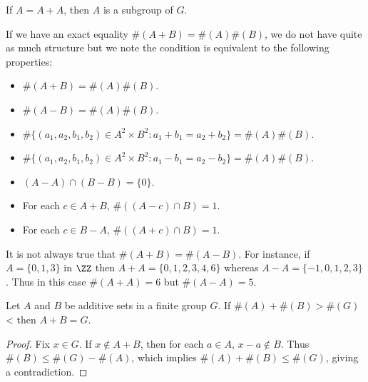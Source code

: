 \begin{corollary}
    If $A = A + A$, then $A$ is a subgroup of $G$.
\end{corollary}

If we have an exact equality $\#(A + B) = \#(A) \#(B)$, we do not have quite as much structure but we note the condition is equivalent to the following properties:
%
\begin{itemize}
    \item $\#(A + B) = \#(A) \#(B)$.
    \item $\#(A - B) = \#(A) \#(B)$.
    \item $\# \{ (a_1,a_2,b_1,b_2) \in A^2 \times B^2 : a_1 + b_1 = a_2 + b_2 \} = \#(A) \#(B)$.
    \item $\# \{ (a_1,a_2,b_1,b_2) \in A^2 \times B^2 : a_1 - b_1 = a_2 - b_2 \} = \#(A) \#(B)$.
    \item $(A - A) \cap (B - B) = \{ 0 \}$.
    \item For each $c \in A + B$, $\#((A - c) \cap B) = 1$.
    \item For each $c \in B - A$, $\#((A + c) \cap B) = 1$.
\end{itemize}

\begin{remark}
    It is not always true that $\#(A + B) = \#(A - B)$. For instance, if $A = \{ 0, 1, 3 \}$ in $\ZZ$ then $A + A = \{ 0,1,2,3,4,6 \}$ whereas $A - A = \{ -1,0,1,2,3 \}$. Thus in this case $\#(A + A) = 6$ but $\#(A - A) = 5$.
\end{remark}

\begin{theorem}
    Let $A$ and $B$ be additive sets in a finite group $G$. If $\#(A) + \#(B) > \#(G)$< then $A + B = G$.
\end{theorem}
\begin{proof}
    Fix $x \in G$. If $x \not \in A + B$, then for each $a \in A$, $x - a \not \in B$. Thus $\#(B) \leq \#(G) - \#(A)$, which implies $\#(A) + \#(B) \leq \#(G)$, giving a contradiction.
\end{proof}


